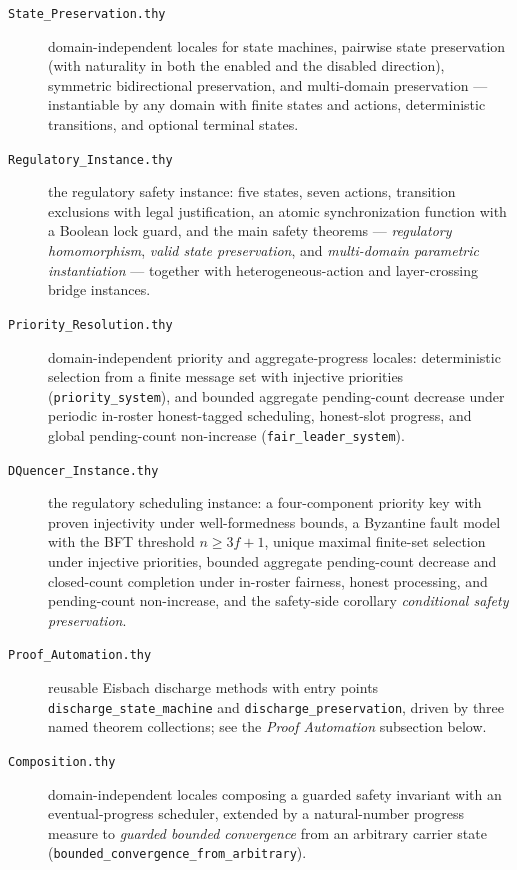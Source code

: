\documentclass[11pt,a4paper]{article}
\begin{document}
\begin{description}
\item[\texttt{State\_Preservation.thy}] domain-independent locales for
  state machines, pairwise state preservation (with naturality in both the
  enabled and the disabled direction), symmetric bidirectional
  preservation, and multi-domain preservation --- instantiable by any
  domain with finite states and actions, deterministic transitions, and
  optional terminal states.

\item[\texttt{Regulatory\_Instance.thy}] the regulatory safety instance:
  five states, seven actions, transition exclusions with legal
  justification, an atomic synchronization function with a Boolean lock guard, and
  the main safety theorems --- \emph{regulatory homomorphism}, \emph{valid
  state preservation}, and \emph{multi-domain parametric instantiation} ---
  together with heterogeneous-action and layer-crossing bridge instances.

\item[\texttt{Priority\_Resolution.thy}] domain-independent priority and
  aggregate-progress
  locales: deterministic selection from a finite message set with
  injective priorities (\texttt{priority\_system}), and bounded aggregate
  pending-count decrease under periodic in-roster honest-tagged scheduling,
  honest-slot progress, and global pending-count non-increase
  (\texttt{fair\_leader\_system}).

\item[\texttt{DQuencer\_Instance.thy}] the regulatory scheduling instance:
  a four-component priority key with proven injectivity under
  well-formedness bounds, a Byzantine fault model with the BFT threshold
  $n \geq 3f + 1$, unique maximal finite-set selection under injective
  priorities, bounded aggregate pending-count decrease and closed-count
  completion under in-roster fairness, honest processing, and pending-count
  non-increase,
  and the safety-side corollary \emph{conditional safety preservation}.

\item[\texttt{Proof\_Automation.thy}] reusable Eisbach discharge methods
  with entry points \texttt{discharge\_state\_machine} and
  \texttt{discharge\_preservation}, driven by three named theorem
  collections; see the \emph{Proof Automation} subsection below.

\item[\texttt{Composition.thy}] domain-independent locales composing a
  guarded safety invariant with an eventual-progress scheduler, extended
  by a natural-number progress measure to \emph{guarded bounded
  convergence} from an arbitrary carrier state
  (\texttt{bounded\_convergence\_from\_arbitrary}).


\end{description}
\end{document}

